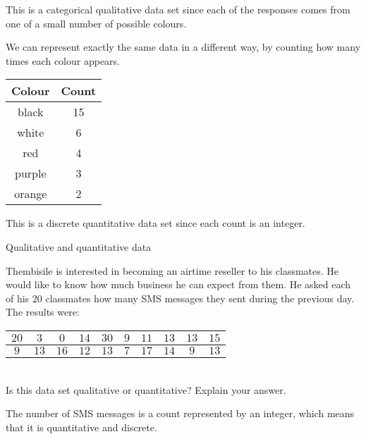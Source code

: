   This is a categorical qualitative data set since each of the
  responses comes from one of a small number of possible colours.

  We can represent exactly the same data in a different way, by
  counting how many times each colour appears.

  \begin{center}
    \begin{tabular}{|c|c|}\hline
      
      \textbf{Colour} & \textbf{Count} \\ \hline

      black & 15 \\
      white & 6 \\
      red & 4 \\
      purple & 3 \\
      orange & 2\\
    \hline
    \end{tabular}
  \end{center}

  This is a discrete quantitative data set since each count is an
  integer.

\begin{wex}{Qualitative and quantitative data}
{Thembisile is interested in becoming an airtime reseller to his
  classmates. He would like to know how much business he can expect
  from them. He asked each of his $20$ classmates how many SMS
  messages they sent during the previous day. The results were:
\\

    \begin{center}
      \begin{tabular}{|c|c|c|c|c|c|c|c|c|c|}\hline
        $20$ & $ 3$ & $ 0$ & $14$ & $30$ & $9$ & $11$ & $13$ & $13$ & $15$ \\ \hline
         $9$ & $13$ & $16$ & $12$ & $13$ & $7$ & $17$ & $14$ & $ 9$ & $13$ \\ \hline
        
      \end{tabular}
    \end{center}
    \vspace{8pt}\\

    Is this data set qualitative or quantitative? Explain your answer.
}{
  The number of SMS messages is a count represented by an integer, which means that it is
  quantitative and discrete.
}
\end{wex}

